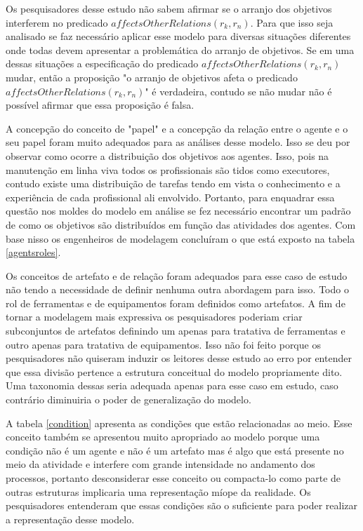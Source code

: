 Os pesquisadores desse estudo não sabem afirmar se o arranjo dos objetivos interferem no predicado $affectsOtherRelations(r_k,r_n)$. Para que isso seja analisado se faz necessário aplicar esse modelo para diversas situações diferentes onde todas devem apresentar a problemática do arranjo de objetivos. Se em uma dessas situações a especificação do predicado $affectsOtherRelations(r_k,r_n)$ mudar, então a proposição "o arranjo de objetivos afeta o predicado $affectsOtherRelations(r_k,r_n)$" é verdadeira, contudo se não mudar não é possível afirmar que essa proposição é falsa. 

A concepção do conceito de "papel" e a concepção da relação entre o agente e o seu papel foram muito adequados para as análises desse modelo. Isso se deu por observar como ocorre a distribuição dos objetivos aos agentes. Isso, pois na manutenção em linha viva todos os profissionais são tidos como executores, contudo existe uma distribuição de tarefas tendo em vista o conhecimento e a experiência de cada profissional ali envolvido. Portanto, para enquadrar essa questão nos moldes do modelo em análise se fez necessário encontrar um padrão de como os objetivos são distribuídos em função das atividades dos agentes. Com base nisso os engenheiros de modelagem concluíram o que está exposto na tabela \ref{agentsroles}.

Os conceitos de artefato e de relação foram adequados para esse caso de estudo não tendo a necessidade de definir nenhuma outra abordagem para isso. Todo o rol de ferramentas e de equipamentos foram definidos como artefatos. A fim de tornar a modelagem mais expressiva os pesquisadores poderiam criar subconjuntos de artefatos definindo um apenas para tratativa de ferramentas e outro apenas para tratativa de equipamentos. Isso não foi feito porque os pesquisadores não quiseram induzir os leitores desse estudo ao erro por entender que essa divisão pertence a estrutura conceitual do modelo propriamente dito. Uma taxonomia dessas seria adequada apenas para esse caso em estudo, caso contrário diminuiria o poder de generalização do modelo. 

A tabela \ref{condition} apresenta as condições que estão relacionadas ao meio. Esse conceito também se apresentou muito apropriado ao modelo porque uma condição não é um agente e não é um artefato mas é algo que está presente no meio da atividade e interfere com grande intensidade no andamento dos processos, portanto desconsiderar esse conceito ou compacta-lo como parte de outras estruturas implicaria uma representação míope da realidade. Os pesquisadores entenderam que essas condições são o suficiente para poder realizar a representação desse modelo.

